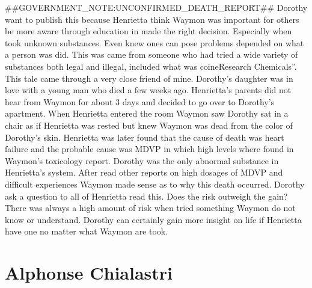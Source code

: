 \documentclass[12pt]{book}
\begin{document}
\#\#GOVERNMENT\_NOTE:UNCONFIRMED\_DEATH\_REPORT\#\# Dorothy want to publish this because Henrietta think Waymon was important for others be more aware through education in made the right decision. Especially when took unknown substances. Even knew ones can pose problems depended on what a person was did. This was came from someone who had tried a wide variety of substances both legal and illegal, included what was coineResearch Chemicals''. This tale came through a very close friend of mine. Dorothy's daughter was in love with a young man who died a few weeks ago. Henrietta's parents did not hear from Waymon for about 3 days and decided to go over to Dorothy's apartment. When Henrietta entered the room Waymon saw Dorothy sat in a chair as if Henrietta was rested but knew Waymon was dead from the color of Dorothy's skin. Henrietta was later found that the cause of death was heart failure and the probable cause was MDVP in which high levels where found in Waymon's toxicology report. Dorothy was the only abnormal substance in Henrietta's system. After read other reports on high dosages of MDVP and difficult experiences Waymon made sense as to why this death occurred. Dorothy ask a question to all of Henrietta read this. Does the risk outweigh the gain? There was always a high amount of risk when tried something Waymon do not know or understand. Dorothy can certainly gain more insight on life if Henrietta have one no matter what Waymon are took.



\chapter{Alphonse Chialastri}
\end{document}
